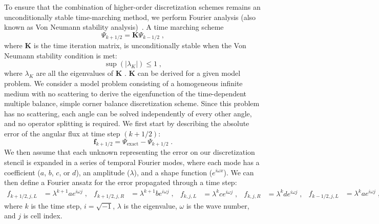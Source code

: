 To ensure that the combination of higher-order discretization schemes remains an unconditionally stable time-marching method, we perform Fourier analysis (also known as Von Neumann stability analysis)~\cite{leveque2007finite}.
A time marching scheme
\begin{equation}
    \Psi_{k+1/2} = \bm{K} \Psi_{k-1/2} \;,
\end{equation}
where $\bm{K}$ is the time iteration matrix, is unconditionally stable when the Von Neumann stability condition is met:
\begin{equation}
    \sup(\left|\lambda_{K}\right|) \leq 1 \;,
    \label{eq:unconstab}
\end{equation}
where $\lambda_{K}$ are all the eigenvalues of $\bm{K}$ \cite{golub_matrix_1983, isaacson_numerical_1966}.
$\bm{K}$ can be derived for a given model problem.
We consider a model problem consisting of a homogeneous infinite medium with no scattering to derive the eigenfunction of the time-dependent multiple balance, simple corner balance discretization scheme.
Since this problem has no scattering, each angle can be solved independently of every other angle, and no operator splitting is required.
We first start by describing the absolute error of the angular flux at time step $(k+1/2)$:
\begin{equation}
    \mathbf{f}_{k+1/2} = \Psi_{\text{exact}} - \Psi_{k+1/2} \;.
\end{equation}
We then assume that each unknown representing the error on our discretization stencil is expanded in a series of temporal Fourier modes, where each mode has a coefficient ($a$, $b$, $c$, or $d$), an amplitude ($\lambda$), and a shape function ($e^{i\omega x}$).
We can then define a Fourier ansatz for the error propagated through a time step:
\begin{subequations}
\begin{align}
    f_{k+1/2,j,L} &= \lambda^{k+1}a e^{i\omega j} \; ,
    &
    f_{k+1/2,j,R} &= \lambda^{k+1}b e^{i\omega j} \; ,
\end{align}
\begin{align}
    f_{k,j,L} &= \lambda^{k}c e^{i\omega j} \; ,
    &
    f_{k,j,R} &= \lambda^{k}d e^{i\omega j} \; ,
\end{align}
\begin{align}
    f_{k-1/2,j,L} &= \lambda^{k}a e^{i\omega j} \; ,
    &
    f_{k-1/2,j,R} &= \lambda^{k}b e^{i\omega j} \; ,
\end{align}
\end{subequations}
where $k$ is the time step, $i=\sqrt{-1}$, $\lambda$ is the eigenvalue, $\omega$ is the wave number, and $j$ is cell index. 
